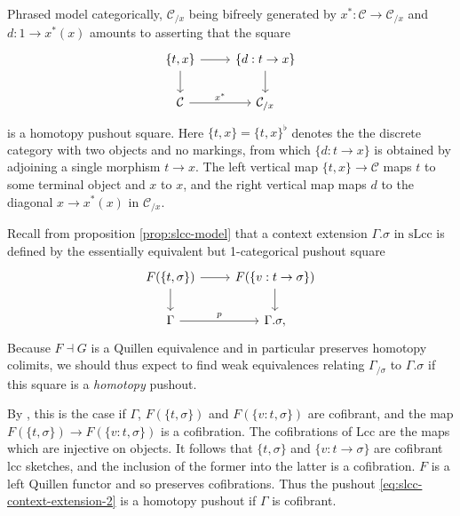 \documentclass[a4paper]{article}
\theoremstyle{remark}
\theoremstyle{definition}
\begin{document}
Phrased model categorically, $\mathcal{C}_{/ x}$ being bifreely generated by $x^* : \mathcal{C} \rightarrow \mathcal{C}_{/ x}$ and $d : 1 \rightarrow x^*(x)$ amounts to asserting that the square
\begin{equation}
  \label{eq:homotopy-pushout-lcc}
  \begin{tikzcd}
    \{ t, x \} \arrow[r] \arrow[d] & \{ d : t \rightarrow x \} \arrow[d] \\
    \mathcal{C} \arrow[r, "x^*"] & \mathcal{C}_{/ x}
  \end{tikzcd}
\end{equation}
is a homotopy pushout square.
Here $\{t, x\} = \{t, x\}^\flat$ denotes the the discrete category with two objects and no markings, from which $\{d : t \rightarrow x\}$ is obtained by adjoining a single morphism $t \rightarrow x$.
The left vertical map $\{ t, x \} \rightarrow \mathcal{C}$ maps $t$ to some terminal object and $x$ to $x$, and the right vertical map maps $d$ to the diagonal $x \rightarrow x^*(x)$ in $\mathcal{C}_{/ x}$.

Recall from proposition \ref{prop:slcc-model} that a context extension $\Gamma.\sigma$ in $\mathrm{sLcc}$ is defined by the essentially equivalent but 1-categorical pushout square
\begin{equation}
  \label{eq:slcc-context-extension-2}
  \begin{tikzcd}
    F(\{ t, \sigma \}) \arrow[d] \arrow[r] & F(\{ v : t \rightarrow \sigma \}) \arrow[d] \\
    \Gamma \arrow[r, "p"] & \Gamma.\sigma,
  \end{tikzcd}
\end{equation}
Because $F \dashv G$ is a Quillen equivalence and in particular preserves homotopy colimits, we should thus expect to find weak equivalences relating $\Gamma_{/ \sigma}$ to $\Gamma.\sigma$ if this square is a \emph{homotopy} pushout.

By \cite[Proposition A.2.4.4]{higher-topos-theory}, this is the case if $\Gamma$, $F(\{t, \sigma\})$ and $F(\{v : t, \sigma\})$ are cofibrant, and the map $F(\{t, \sigma\}) \rightarrow F(\{v : t, \sigma\})$ is a cofibration.
The cofibrations of $\mathrm{Lcc}$ are the maps which are injective on objects.
It follows that $\{t, \sigma\}$ and $\{ v : t \rightarrow \sigma\}$ are cofibrant lcc sketches, and the inclusion of the former into the latter is a cofibration.
$F$ is a left Quillen functor and so preserves cofibrations.
Thus the pushout \eqref{eq:slcc-context-extension-2} is a homotopy pushout if $\Gamma$ is cofibrant.
\end{document}
